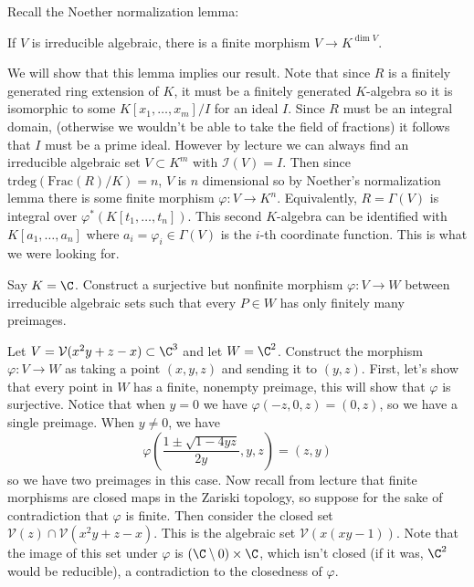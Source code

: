 \documentclass[11pt,letterpaper]{article}
\begin{document}
\begin{solution}
    Recall the Noether normalization lemma:
    \begin{ilemma}
        If $V$ is irreducible algebraic, there is a finite morphism $V\to K^{\dim V}$.
    \end{ilemma}

    We will show that this lemma implies our result. Note that since $R$ is a finitely generated ring extension of $K$, it must be a finitely generated $K$-algebra so it is isomorphic to some $K[x_1,\ldots,x_m]/I$ for an ideal $I$. Since $R$ must be an integral domain, (otherwise we wouldn't be able to take the field of fractions) it follows that $I$ must be a prime ideal. However by lecture we can always find an irreducible algebraic set $V\subset K^m$ with $\mathcal{I}(V)=I$. Then since $\textrm{trdeg}(\textrm{Frac}(R) / K)=n$, $V$ is $n$ dimensional so by Noether's normalization lemma there is some finite morphism $\varphi : V \to K^n$. Equivalently, $R=\Gamma(V)$ is integral over $\varphi^*(K[t_1,\ldots,t_n])$. This second $K$-algebra can be identified with $K[a_1,\ldots, a_n]$ where $a_i=\varphi_i\in \Gamma(V)$ is the $i$-th coordinate function. This is what we were looking for.
\end{solution}    

\begin{problem}
    Say $K=\C$. Construct a surjective but nonfinite morphism $\varphi:V\rightarrow W$ between irreducible algebraic sets such that every $P\in W$ has only finitely many preimages.
\end{problem}

\begin{solution}
    Let $V=\mathcal{V}(x^2y+z-x)\subset\C^3$ and let $W=\C^2$. Construct the morphism $\varphi : V \to W$ as taking a point $(x,y,z)$ and sending it to $(y,z)$. First, let's show that every point in $W$ has a finite, nonempty preimage, this will show that $\varphi$ is surjective. Notice that when $y=0$ we have $\varphi(-z,0,z)=(0,z)$, so we have a single preimage. When $y\neq 0$, we have
    \[
        \varphi\left(\frac{1\pm \sqrt{1-4yz}}{2y}, y,z\right) = (z,y)
    \] 
    so we have two preimages in this case. Now recall from lecture that finite morphisms are closed maps in the Zariski topology, so suppose for the sake of contradiction that $\varphi$ is finite. Then consider the closed set $\mathcal{V}(z)\cap \mathcal{V}(x^2y+z-x)$. This is the algebraic set $\mathcal{V}(x(xy-1))$. Note that the image of this set under $\varphi$ is $(\C\setminus 0)\times \C$, which isn't closed (if it was, $\C^2$ would be reducible), a contradiction to the closedness of $\varphi$.
\end{solution}
\end{document}
